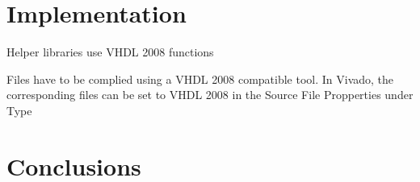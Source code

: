\begin{refsection}
\section{Implementation}


Helper libraries use VHDL 2008 functions

Files have to be complied using a VHDL 2008 compatible tool. In Vivado, the corresponding files can be set to VHDL 2008 in the Source File Propperties under Type 



\section{Conclusions}

\printbibliography[heading=subbibliography]
\end{refsection}
